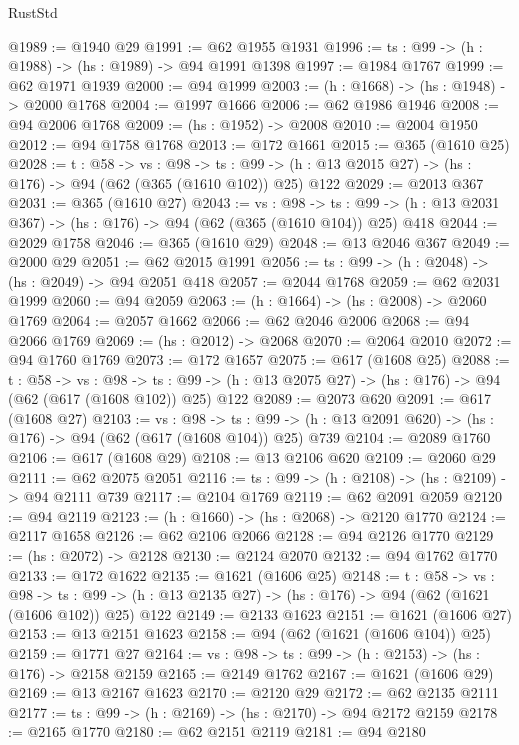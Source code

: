 \begin{lexlean}{RustStd}
\begin{coremodule}
@1989 := @1940 @29
@1991 := @62 @1955 @1931
@1996 := {ts : @99} -> (h : @1988) -> (hs : @1989) -> @94 @1991 @1398
@1997 := @1984 @1767
@1999 := @62 @1971 @1939
@2000 := @94 @1999
@2003 := (h : @1668) -> (hs : @1948) -> @2000 @1768
@2004 := @1997 @1666
@2006 := @62 @1986 @1946
@2008 := @94 @2006 @1768
@2009 := (hs : @1952) -> @2008
@2010 := @2004 @1950
@2012 := @94 @1758 @1768
@2013 := @172 @1661
@2015 := @365 (@1610 @25)
@2028 := {t : @58} ->
  {vs : @98} ->
  {ts : @99} -> (h : @13 @2015 @27) -> (hs : @176) -> @94 (@62 (@365 (@1610 @102)) @25) @122
@2029 := @2013 @367
@2031 := @365 (@1610 @27)
@2043 := {vs : @98} ->
  {ts : @99} -> (h : @13 @2031 @367) -> (hs : @176) -> @94 (@62 (@365 (@1610 @104)) @25) @418
@2044 := @2029 @1758
@2046 := @365 (@1610 @29)
@2048 := @13 @2046 @367
@2049 := @2000 @29
@2051 := @62 @2015 @1991
@2056 := {ts : @99} -> (h : @2048) -> (hs : @2049) -> @94 @2051 @418
@2057 := @2044 @1768
@2059 := @62 @2031 @1999
@2060 := @94 @2059
@2063 := (h : @1664) -> (hs : @2008) -> @2060 @1769
@2064 := @2057 @1662
@2066 := @62 @2046 @2006
@2068 := @94 @2066 @1769
@2069 := (hs : @2012) -> @2068
@2070 := @2064 @2010
@2072 := @94 @1760 @1769
@2073 := @172 @1657
@2075 := @617 (@1608 @25)
@2088 := {t : @58} ->
  {vs : @98} ->
  {ts : @99} -> (h : @13 @2075 @27) -> (hs : @176) -> @94 (@62 (@617 (@1608 @102)) @25) @122
@2089 := @2073 @620
@2091 := @617 (@1608 @27)
@2103 := {vs : @98} ->
  {ts : @99} -> (h : @13 @2091 @620) -> (hs : @176) -> @94 (@62 (@617 (@1608 @104)) @25) @739
@2104 := @2089 @1760
@2106 := @617 (@1608 @29)
@2108 := @13 @2106 @620
@2109 := @2060 @29
@2111 := @62 @2075 @2051
@2116 := {ts : @99} -> (h : @2108) -> (hs : @2109) -> @94 @2111 @739
@2117 := @2104 @1769
@2119 := @62 @2091 @2059
@2120 := @94 @2119
@2123 := (h : @1660) -> (hs : @2068) -> @2120 @1770
@2124 := @2117 @1658
@2126 := @62 @2106 @2066
@2128 := @94 @2126 @1770
@2129 := (hs : @2072) -> @2128
@2130 := @2124 @2070
@2132 := @94 @1762 @1770
@2133 := @172 @1622
@2135 := @1621 (@1606 @25)
@2148 := {t : @58} ->
  {vs : @98} ->
  {ts : @99} -> (h : @13 @2135 @27) -> (hs : @176) -> @94 (@62 (@1621 (@1606 @102)) @25) @122
@2149 := @2133 @1623
@2151 := @1621 (@1606 @27)
@2153 := @13 @2151 @1623
@2158 := @94 (@62 (@1621 (@1606 @104)) @25)
@2159 := @1771 @27
@2164 := {vs : @98} -> {ts : @99} -> (h : @2153) -> (hs : @176) -> @2158 @2159
@2165 := @2149 @1762
@2167 := @1621 (@1606 @29)
@2169 := @13 @2167 @1623
@2170 := @2120 @29
@2172 := @62 @2135 @2111
@2177 := {ts : @99} -> (h : @2169) -> (hs : @2170) -> @94 @2172 @2159
@2178 := @2165 @1770
@2180 := @62 @2151 @2119
@2181 := @94 @2180

\end{coremodule}
\end{lexlean}
